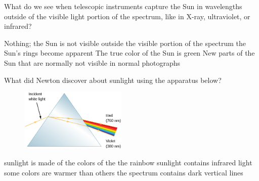 \documentclass[addpoints]{exam}
\begin{document}
\begin{questions}




\question
What do we see when telescopic instruments capture the Sun in wavelengths outside of the visible light portion of the spectrum, like in X-ray, ultraviolet, or infrared?

\begin{choices}
    \choice Nothing; the Sun is not visible outside the visible portion of the spectrum
    \choice the Sun's rings become apparent
    \choice The true color of the Sun is green
    \correctchoice New parts of the Sun that are normally not visible in normal photographs
\end{choices}

\question
What did Newton discover about sunlight using the apparatus below?

\begin{figure}[h!]
    \centering
    \includegraphics[width=2in]{Figures/Figure5.9.jpg}
\end{figure}

\begin{choices}
    \correctchoice sunlight is made of the colors of the the rainbow
    \choice sunlight contains infrared light
    \choice some colors are warmer than others
    \choice the spectrum contains dark vertical lines
\end{choices}


\end{questions}
\end{document}
